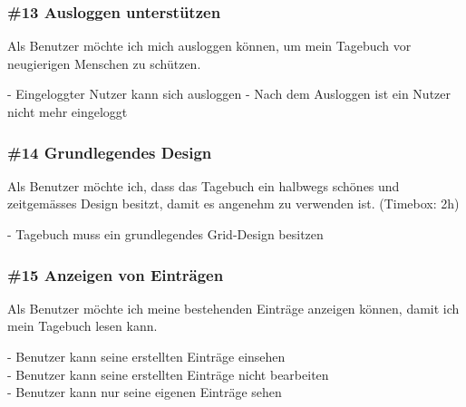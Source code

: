 \subsubsection*{\#13 Ausloggen unterstützen}
Als Benutzer möchte ich mich ausloggen können, um mein Tagebuch vor neugierigen Menschen zu schützen.

\noindent
- Eingeloggter Nutzer kann sich ausloggen
- Nach dem Ausloggen ist ein Nutzer nicht mehr eingeloggt


\subsubsection*{\#14 Grundlegendes Design}
Als Benutzer möchte ich, dass das Tagebuch ein halbwegs schönes und zeitgemässes Design besitzt, damit es angenehm zu verwenden ist. (Timebox: 2h)

\noindent
- Tagebuch muss ein grundlegendes Grid-Design besitzen


\subsubsection*{\#15 Anzeigen von Einträgen}
Als Benutzer möchte ich meine bestehenden Einträge anzeigen können, damit ich mein Tagebuch lesen kann.

\noindent
- Benutzer kann seine erstellten Einträge einsehen\\
- Benutzer kann seine erstellten Einträge nicht bearbeiten\\
- Benutzer kann nur seine eigenen Einträge sehen
